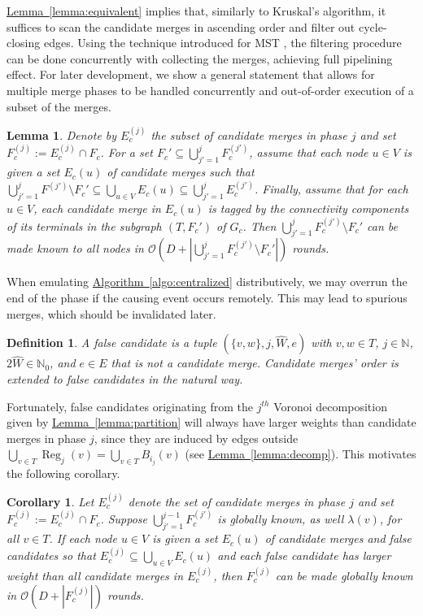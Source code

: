 \documentclass[letterpaper,11pt]{article}
\newtheorem{lemma}[theorem]{Lemma}
\newtheorem{definition}[theorem]{Definition}
\newtheorem{corollary}[theorem]{Corollary}
\newcommand{\namedref}[2]{\hyperref[#2]{#1~\ref*{#2}}}
\newcommand{\lemmaref}[1]{\namedref{Lemma}{#1}}
\newcommand{\algref}[1]{\namedref{Algorithm}{#1}}
\newcommand{\N}{\mathbb{N}}
\newcommand{\BO}{\mathcal{O}}
\newcommand{\Comp}{\lambda}
\DeclareMathOperator{\reg}{Reg}
\begin{document}
\lemmaref{lemma:equivalent} implies that, similarly to Kruskal's
algorithm, it suffices to scan the candidate
merges in ascending order and filter out cycle-closing edges.
Using the technique introduced for MST \cite{GarayKP-98,KuttenP-98},
the filtering 
procedure can be done concurrently with collecting the merges, achieving full
pipelining effect. For later development,
we show a general
statement that allows for multiple merge phases to be handled concurrently and
out-of-order execution of a subset of the merges.
\begin{lemma}\label{lemma:filtering}
  Denote by $E_c^{(j)}$ the subset of candidate merges in phase $j$
  and set $F_c^{(j)}:=E_c^{(j)}\cap F_c$. For a set $F_c'\subseteq
  \bigcup_{j'=1}^{j}F_c^{(j')}$, assume that each node $u\in V$ is
  given a set $E_c(u)$ of candidate merges such that 
$\bigcup_{j'=1}^j F^{(j')}\setminus F_c'
  \subseteq
  \bigcup_{u\in V}E_c(u)
  \subseteq 
  \bigcup_{j'=1}^j E_c^{(j')}$. Finally, assume
  that for each $u\in V$, each candidate merge in $E_c(u)$ is tagged
  by the connectivity components of its terminals in the subgraph
  $(T,F_c')$ of $G_c$. Then $\bigcup_{j'=1}^j F_c^{(j')}\setminus
  F_c'$ can be made known to all nodes in $\BO(D+|\bigcup_{j'=1}^j
  F_c^{(j')}\setminus F_c'|)$ rounds.
\end{lemma}

When emulating \algref{algo:centralized} distributively, we may
overrun the end of the phase if the causing event occurs
remotely. This may lead to spurious merges, which should be
invalidated later.

\begin{definition}
A \emph{false candidate} is a tuple $(\{v,w\},j,\hat{W},e)$ with $v,w\in T$,
$j\in \N$, $2\hat{W}\in \N_0$, and $e\in E$ that is not a candidate
merge. Candidate merges' order is extended to false candidates in the
natural way.
\end{definition}

Fortunately, false candidates originating from the $j^{th}$ Voronoi
decomposition given by \lemmaref{lemma:partition} will always have larger
weights than candidate merges in phase $j$, since they are 
induced by edges outside $\bigcup_{v\in 
T}\reg_j(v)=\bigcup_{v\in T}B_{i_j}(v)$ (see \lemmaref{lemma:decomp}). This
motivates the following corollary.

\begin{corollary}\label{coro:filtering}
Let $E_c^{(j)}$ denote the set of candidate merges in phase $j$ and set
$F_c^{(j)}:=E_c^{(j)}\cap F_c$. Suppose
$\bigcup_{j'=1}^{j-1}F_c^{(j')}$ is globally known, as well
$\Comp(v)$, for all $v\in T$. If each node $u\in V$ 
is given a set $E_c(u)$ of candidate merges and false candidates so that
$E_c^{(j)}\subseteq \bigcup_{u\in V}E_c(u)$ and each false candidate has larger
weight than all candidate merges in $E_c^{(j)}$, then $F_c^{(j)}$ can be made
globally known in $\BO(D+|F_c^{(j)}|)$ rounds.
\end{corollary}
\end{document}

